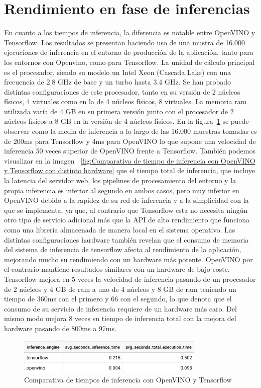 \section{Rendimiento en fase de inferencias}\label{sec:ren-dimiento-en-fase-de-inferencias}
En cuanto a los tiempos de inferencia, la diferencia es notable entre OpenVINO y Tensorflow.
Los resultados se presentan haciendo uso de una mustra de 16.000 ejecuciones de inferencia en el entorno de producción de la aplicación, tanto para los entornos con Openvino, como para Tensorflow.
La unidad de cálculo principal es el procesador, siendo su modelo un Intel Xeon (Cascada Lake) con una frecuencia de 2.8 GHz de base y un turbo hasta 3.4 GHz.
Se han probado distintas configuraciones de este procesador, tanto en su versión de 2 núcleos físicos, 4 virtuales como en la de 4 núcleos físicos, 8 virtuales.
La memoria ram utilizada varía de 4 GB en su primera versión junto con el procesador de 2 núcleos físicos a 8 GB en la versión de 4 núcleos físicos.
En la figura~\ref{fig:Comparativa de tiempo de inferencia con OpenVINO y Tensorflow} se puede observar como la media de inferencia a lo largo de las 16.000 muestras tomadas
es de 200ms para Tensorflow y 4ms para OpenVINO lo que supone una velocidad de inferencia 50 veces superior de OpenVINO frente a Tensorflow.
También podemos visualizar en la imagen ~\ref{fig:Comparativa de tiempo de inferencia con OpenVINO y Tensorflow con distinto hardware} que el tiempo total de inferencia,
que incluye la latencia del servidor web, los pipelines de procesamiento del entorno y la propia inferencia es inferior al segundo en ambos casos,
pero muy inferior en OpenVINO debido a la rapidez de su red de inferencia y a la simplicidad con la que se implementa, ya que, al contrario que Tensorflow esta no necesita ningún otro tipo de servicio adicional más
que la API de alto rendimiento que funciona como una librería almacenada de manera local en el sistema operativo.
Las distintas configuraciones hardware también revelan que el consumo de memoria del sistema de inferencia de tensorflow afecta al rendimiento de la aplicación, mejorando mucho su rendimiendo con un hardware más potente.
OpenVINO por el contrario mantiene resultados similares con un hardware de bajo coste.
Tensorflow mejora en 5 veces la velocidad de inferencia pasando de un procesador de 2 núcleos y 4 GB de ram a uno de 4 núcleos y 8 GB de ram teniendo un tiempo de 360ms con el primero y 66 con el segundo, lo que denota que el consumo
de su servicio de inferencia requiere de un hardware más caro.
Del mismo modo mejora 8 veces su tiempo de inferencia total con la mejora del hardware pasando de 800ms a 97ms.
\begin{figure}
    \centering
    \includegraphics[width=0.8\textwidth]{images/chapter5/time_inference_engine.png}
    \caption{Comparativa de tiempos de inferencia con OpenVINO y Tensorflow}
    \label{fig:Comparativa de tiempo de inferencia con OpenVINO y Tensorflow}
\end{figure}

